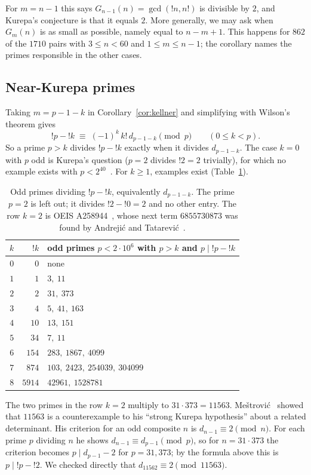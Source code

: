 \documentclass[11pt]{amsart}
\theoremstyle{plain}
\theoremstyle{definition}
\theoremstyle{remark}
\begin{document}
For $m=n-1$ this says $G_{n-1}(n)=\gcd(!n,n!)$ is divisible by $2$, and
Kurepa's conjecture is that it equals $2$. More generally, we may ask when
$G_m(n)$ is as small as possible, namely equal to $n-m+1$. This happens for
$862$ of the $1710$ pairs with $3\le n<60$ and $1\le m\le n-1$; the corollary
names the primes responsible in the other cases.

\subsection{Near-Kurepa primes}
Taking $m=p-1-k$ in Corollary~\ref{cor:kellner} and simplifying with Wilson's
theorem gives
\[
  !p-{!k}\;\equiv\;(-1)^k\,k!\,d_{p-1-k}\pmod p\qquad(0\le k<p).
\]
So a prime $p>k$ divides $!p-{!k}$ exactly when it divides $d_{p-1-k}$. The
case $k=0$ with $p$ odd is Kurepa's question ($p=2$ divides $!2=2$ trivially),
for which no example exists with
$p<2^{40}$~\cite{AndrejicTatarevic,ABT2021}. For $k\ge1$, examples
exist (Table~\ref{tab:nearkurepa}).

\begin{table}[!ht]
\centering
\begin{tabular}{@{}rrl@{}}
\toprule
$k$ & $!k$ & odd primes $p<2\cdot10^6$ with $p>k$ and $p\mid{!p}-{!k}$\\
\midrule
$0$ & $0$ & none\\
$1$ & $1$ & $3,\ 11$\\
$2$ & $2$ & $31,\ 373$\\
$3$ & $4$ & $5,\ 41,\ 163$\\
$4$ & $10$ & $13,\ 151$\\
$5$ & $34$ & $7,\ 11$\\
$6$ & $154$ & $283,\ 1867,\ 4099$\\
$7$ & $874$ & $103,\ 2423,\ 254039,\ 304099$\\
$8$ & $5914$ & $42961,\ 1528781$\\
\bottomrule
\end{tabular}
\caption{Odd primes dividing $!p-{!k}$, equivalently $d_{p-1-k}$. The prime
$p=2$ is left out; it divides $!2-{!0}=2$ and no other entry. The row $k=2$
is OEIS A258944~\cite{A258944}, whose next term $6855730873$ was found by
Andreji\'c and Tatarevi\'c~\cite{AndrejicTatarevic}.}
\label{tab:nearkurepa}
\end{table}

The two primes in the row $k=2$ multiply to $31\cdot373=11563$.
Me\v{s}trovi\'c~\cite{Mestrovic} showed that $11563$ is a counterexample to his
``strong Kurepa hypothesis'' about a related determinant. His criterion for an
odd composite $n$ is $d_{n-1}\equiv2\pmod n$. For each prime $p$ dividing $n$
he shows $d_{n-1}\equiv d_{p-1}\pmod p$, so for $n=31\cdot373$ the criterion
becomes $p\mid d_{p-1}-2$ for $p=31,373$; by the formula above this is
$p\mid{!p}-{!2}$. We checked directly that $d_{11562}\equiv2\pmod{11563}$.
\end{document}

